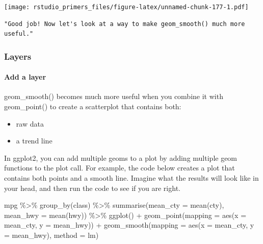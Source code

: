 \documentclass[
]{article}
\newenvironment{Shaded}{\begin{snugshade}}{\end{snugshade}}
\newcommand{\AttributeTok}[1]{\textcolor[rgb]{0.77,0.63,0.00}{#1}}
\newcommand{\FunctionTok}[1]{\textcolor[rgb]{0.00,0.00,0.00}{#1}}
\newcommand{\NormalTok}[1]{#1}
\newcommand{\SpecialCharTok}[1]{\textcolor[rgb]{0.00,0.00,0.00}{#1}}
\providecommand{\tightlist}{%
  \setlength{\itemsep}{0pt}\setlength{\parskip}{0pt}}
\begin{document}
\texttt{[image: rstudio\_primers\_files/figure-latex/unnamed-chunk-177-1.pdf]}

\begin{verbatim}
"Good job! Now let's look at a way to make geom_smooth() much more useful."
\end{verbatim}

\hypertarget{layers}{%
\subsubsection{Layers}\label{layers}}

\hypertarget{add-a-layer}{%
\paragraph{Add a layer}\label{add-a-layer}}

geom\_smooth() becomes much more useful when you combine it with
geom\_point() to create a scatterplot that contains both:

\begin{itemize}
\tightlist
\item
  raw data
\item
  a trend line
\end{itemize}

In ggplot2, you can add multiple geoms to a plot by adding multiple geom
functions to the plot call. For example, the code below creates a plot
that contains both points and a smooth line. Imagine what the results
will look like in your head, and then run the code to see if you are
right.

\begin{Shaded}
\begin{Highlighting}[]
\NormalTok{mpg }\SpecialCharTok{\%\textgreater{}\%} 
  \FunctionTok{group\_by}\NormalTok{(class) }\SpecialCharTok{\%\textgreater{}\%} 
  \FunctionTok{summarise}\NormalTok{(}\AttributeTok{mean\_cty =} \FunctionTok{mean}\NormalTok{(cty), }\AttributeTok{mean\_hwy =} \FunctionTok{mean}\NormalTok{(hwy)) }\SpecialCharTok{\%\textgreater{}\%} 
  \FunctionTok{ggplot}\NormalTok{() }\SpecialCharTok{+}
    \FunctionTok{geom\_point}\NormalTok{(}\AttributeTok{mapping =} \FunctionTok{aes}\NormalTok{(}\AttributeTok{x =}\NormalTok{ mean\_cty, }\AttributeTok{y =}\NormalTok{ mean\_hwy)) }\SpecialCharTok{+}
    \FunctionTok{geom\_smooth}\NormalTok{(}\AttributeTok{mapping =} \FunctionTok{aes}\NormalTok{(}\AttributeTok{x =}\NormalTok{ mean\_cty, }\AttributeTok{y =}\NormalTok{ mean\_hwy), }\AttributeTok{method =}\NormalTok{ lm) }
\end{Highlighting}
\end{Shaded}
\end{document}
